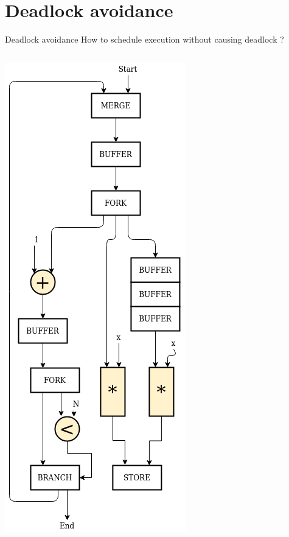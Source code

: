 \documentclass{beamer}
\begin{document}
\begin{frame}[fragile]
\begin{columns}[T]
\begin{column}{0.45\textwidth}
    \end{column}
  \end{columns}
\end{frame}

\section{Deadlock avoidance}
\begin{frame}{Deadlock avoidance}
  How to schedule execution without causing deadlock ?
  \begin{columns}[T]
    \begin{column}{0.25\textwidth}
      \includegraphics[scale=0.25]{blocking_unshared.png}
    \end{column}
    \begin{column}{0.1\textwidth}

\end{column}
\end{columns}
\end{frame}
\end{document}
